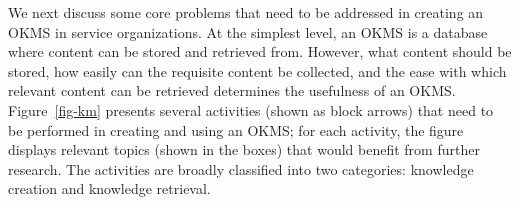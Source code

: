We next discuss some core problems that need to be addressed in creating an OKMS
in service organizations. At the simplest level, an OKMS is a database where
content can be stored and retrieved from. However, what content should be
stored, how easily can the requisite content be collected, and the ease with which relevant
content can be retrieved determines the usefulness of an OKMS.
Figure~\ref{fig-km} presents several activities (shown as block arrows) that
need to be performed in creating and using an OKMS; for each activity, the
figure displays relevant topics (shown in the boxes) that would benefit from
further research. The activities are broadly classified into two categories:
knowledge creation and knowledge retrieval.





